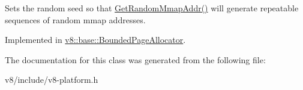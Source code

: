 Sets the random seed so that \mbox{\hyperlink{classv8_1_1PageAllocator_a37f194f9c5fdbe5105476cbd1432418c}{Get\+Random\+Mmap\+Addr()}} will generate repeatable sequences of random mmap addresses. 

Implemented in \mbox{\hyperlink{classv8_1_1base_1_1BoundedPageAllocator_a53d343cc7d2acb2f059e6dd4ea29bc0f}{v8\+::base\+::\+Bounded\+Page\+Allocator}}.



The documentation for this class was generated from the following file\+:\begin{DoxyCompactItemize}
\item 
v8/include/v8-\/platform.\+h\end{DoxyCompactItemize}
